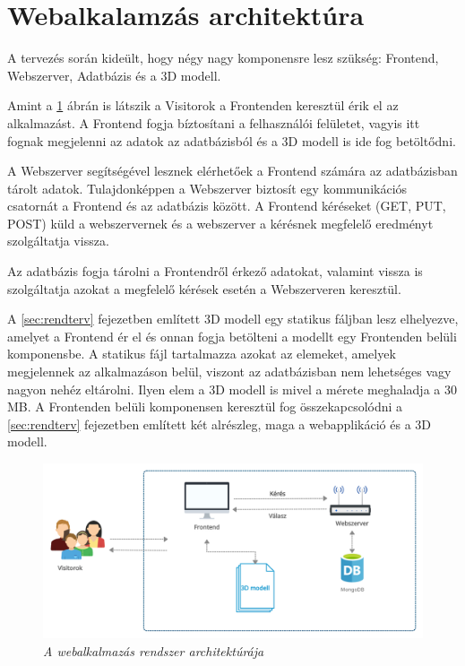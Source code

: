 \section{Webalkalamzás architektúra}

A tervezés során kideült, hogy négy nagy komponensre lesz szükség: Frontend, Webszerver, Adatbázis és a 3D modell.

Amint a \ref{fig:systemArchLittle} ábrán is látszik a Visitorok a Frontenden keresztül érik el az alkalmazást. A Frontend fogja bíztosítani a felhasználói felületet, vagyis itt fognak megjelenni az adatok az adatbázisból és a 3D modell is ide fog betöltődni.

A Webszerver segítségével lesznek elérhetőek a Frontend számára az adatbázisban tárolt adatok. Tulajdonképpen a Webszerver biztosít egy kommunikációs csatornát a Frontend és az adatbázis között. A Frontend kéréseket (GET, PUT, POST) küld a webszervernek és a webszerver a kérésnek megfelelő eredményt szolgáltatja vissza.

Az adatbázis fogja tárolni a Frontendről érkező adatokat, valamint vissza is szolgáltatja azokat a megfelelő kérések esetén a Webszerveren keresztül.

A  \ref{sec:rendterv} fejezetben említett 3D modell egy statikus fáljban lesz elhelyezve, amelyet a Frontend ér el és onnan fogja betölteni a modellt egy Frontenden belüli komponensbe. A statikus fájl tartalmazza azokat az elemeket, amelyek megjelennek az alkalmazáson belül, viszont az adatbázisban nem lehetséges vagy nagyon nehéz eltárolni. Ilyen elem a 3D modell is mivel a mérete meghaladja a 30 MB. A Frontenden belüli komponensen keresztül fog összekapcsolódni a \ref{sec:rendterv} fejezetben említett két alrészleg, maga a webapplikáció és a 3D modell. 
\begin{figure}[H]
	\centering
	\includegraphics[width=1\linewidth]{figures/images/webalkalmazasarchitect.png}
	\caption[A webalkalmazás rendszer architektúrája]{\textit{A webalkalmazás rendszer architektúrája}}
	\label{fig:systemArchLittle}
\end{figure}